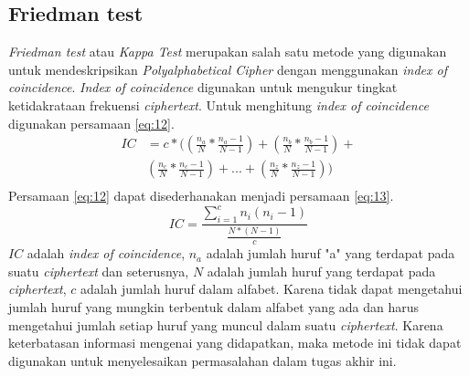 	\subsection{Friedman test}
	\textit{Friedman test} atau \textit{Kappa Test} merupakan salah satu metode yang digunakan untuk mendeskripsikan \textit{Polyalphabetical Cipher} dengan menggunakan \textit{index of coincidence}. \textit{Index of coincidence} digunakan untuk mengukur tingkat ketidakrataan frekuensi \textit{ciphertext}. Untuk menghitung \textit{index of coincidence} digunakan persamaan \ref{eq:12}\cite{henk_encyclopedia_2005}.
	\begin{equation} \label{eq:12}
	\begin{split}
	IC&=c*((\frac{n_a}{N}*\frac{n_a-1}{N-1})+(\frac{n_b}{N}*\frac{n_b-1}{N-1})+ \\
	&(\frac{n_c}{N}*\frac{n_c-1}{N-1})+...+(\frac{n_z}{N}*\frac{n_z-1}{N-1}))\\
	\end{split}
	\end{equation}
	Persamaan \ref{eq:12} dapat disederhanakan menjadi persamaan \ref{eq:13}.
	\begin{equation} \label{eq:13}
	IC=\frac{\sum_{i=1}^{c}n_i(n_i-1)}{\frac{N*(N-1)}{c}}
	\end{equation}
	$IC$ adalah \textit{index of coincidence}, $n_a$ adalah jumlah huruf "a" yang terdapat pada suatu \textit{ciphertext} dan seterusnya, $N$ adalah jumlah huruf yang terdapat pada \textit{ciphertext}, $c$ adalah jumlah huruf dalam alfabet. Karena tidak dapat mengetahui jumlah huruf yang mungkin terbentuk dalam alfabet yang ada dan harus mengetahui jumlah setiap huruf yang muncul dalam suatu \textit{ciphertext}. Karena keterbatasan informasi mengenai \ciphertext yang didapatkan, maka metode ini tidak dapat digunakan untuk menyelesaikan permasalahan dalam tugas akhir ini.
	
